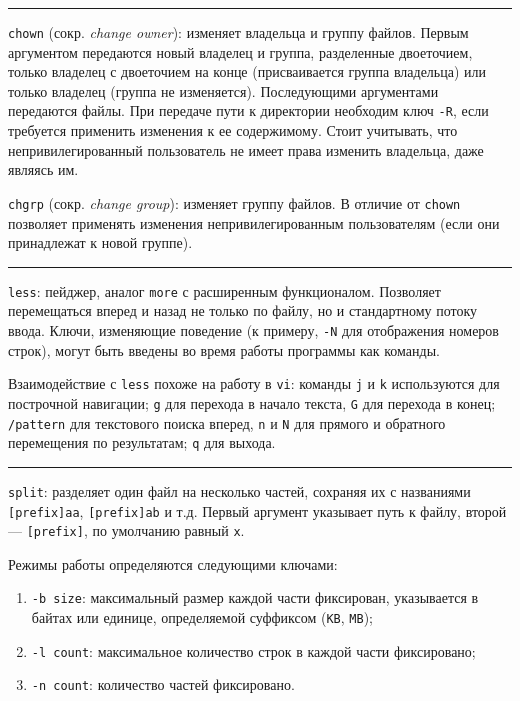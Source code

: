 \documentclass[listings]{labreport}
\begin{document}
\noindent\rule{\textwidth}{1pt}

\texttt{chown} (сокр. \textit{change owner}): изменяет владельца и группу файлов. Первым аргументом передаются новый владелец и группа,
разделенные двоеточием, только владелец с двоеточием на конце (присваивается группа владельца) или только владелец (группа не изменяется).
Последующими аргументами передаются файлы. При передаче пути к директории необходим ключ \texttt{-R}, если требуется применить изменения
к ее содержимому. Стоит учитывать, что непривилегированный пользователь не имеет права изменить владельца, даже являясь им.

\texttt{chgrp} (сокр. \textit{change group}): изменяет группу файлов. В отличие от \texttt{chown} позволяет применять изменения
непривилегированным пользователям (если они принадлежат к новой группе).

\noindent\rule{\textwidth}{1pt}

\texttt{less}: пейджер, аналог \texttt{more} с расширенным функционалом. Позволяет перемещаться вперед и назад не только по файлу, но и
стандартному потоку ввода. Ключи, изменяющие поведение (к примеру, \texttt{-N} для отображения номеров строк), могут быть введены во время
работы программы как команды.

Взаимодействие с \texttt{less} похоже на работу в \texttt{vi}: команды \texttt{j} и \texttt{k} используются для построчной навигации;
\texttt{g} для перехода в начало текста, \texttt{G} для перехода в конец; \texttt{/pattern} для текстового поиска вперед, \texttt{n} и \texttt{N}
для прямого и обратного перемещения по результатам; \texttt{q} для выхода.

\noindent\rule{\textwidth}{1pt}

\texttt{split}: разделяет один файл на несколько частей, сохраняя их с названиями \texttt{[prefix]aa}, \texttt{[prefix]ab} и т.д.
Первый аргумент указывает путь к файлу, второй — \texttt{[prefix]}, по умолчанию равный \texttt{x}.

Режимы работы определяются следующими ключами:

\begin{enumerate}
\item \texttt{-b size}: максимальный размер каждой части фиксирован, указывается в байтах или единице, определяемой суффиксом (\texttt{KB}, \texttt{MB});
\item \texttt{-l count}: максимальное количество строк в каждой части фиксировано;
\item \texttt{-n count}: количество частей фиксировано.
\end{enumerate}
\end{document}

